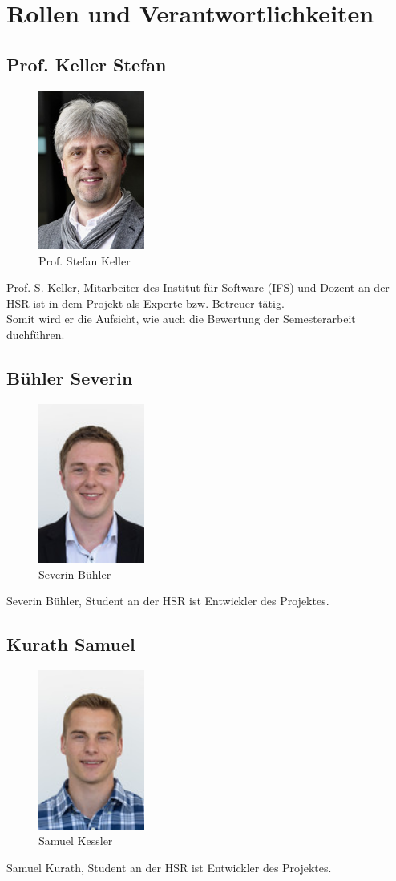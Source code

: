\section{Rollen und Verantwortlichkeiten}
\subsection{Prof. Keller Stefan}
\begin{figure}[H]
	\centering
	\includegraphics[width=35mm]{images/Skeller.jpg}
	\caption{Prof. Stefan Keller}
\end{figure}

Prof. S. Keller, Mitarbeiter des Institut für Software (IFS) und Dozent an
der HSR ist in dem Projekt als Experte bzw. Betreuer tätig. \\
Somit wird er die Aufsicht, wie auch die Bewertung der Semesterarbeit duchführen.

\subsection{Bühler Severin}
\begin{figure}[H]
	\centering
	\includegraphics[width=35mm]{images/sbuehler.jpg}
	\caption{Severin Bühler}
\end{figure}
Severin Bühler, Student an der HSR ist Entwickler des Projektes.

\subsection{Kurath Samuel}
\begin{figure}[H]
	\centering
	\includegraphics[width=35mm]{images/skurath.jpg}
	\caption{Samuel Kessler}
\end{figure}
Samuel Kurath, Student an der HSR ist Entwickler des Projektes.
